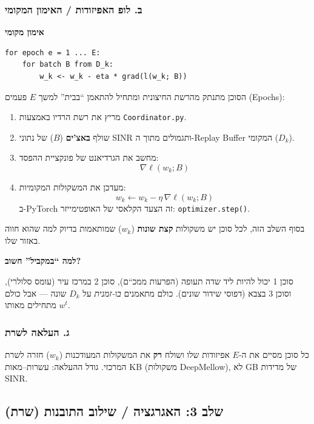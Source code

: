 \documentclass[11pt,a4paper]{article}
\newenvironment{infobox}[2][gray]{%
  \par\smallskip
  \begin{mdframed}[
    linecolor=#1!60!black,
    linewidth=0.7pt,
    backgroundcolor=#1!6,
    roundcorner=3pt,
    innertopmargin=7pt,
    innerbottommargin=7pt,
    innerleftmargin=8pt,
    innerrightmargin=8pt,
    skipabove=6pt,
    skipbelow=6pt
  ]%
  {\color{#1!70!black}\bfseries #2}\par\smallskip
}{%
  \end{mdframed}%
  \par\smallskip
}
\newenvironment{codebox}[1]{\begin{infobox}[gray]{#1}\begin{english}\setLTR}{\end{english}\end{infobox}}
\newcommand{\loss}{\ell}
\begin{document}
\subsubsection{ב. לופ האפיזודות / האימון המקומי}

\begin{codebox}{אימון מקומי}
\begin{lstlisting}[language={}]
for epoch e = 1 ... E:
    for batch B from D_k:
        w_k <- w_k - eta * grad(l(w_k; B))
\end{lstlisting}
\end{codebox}

הסוכן מתנתק מהרשת החיצונית ומתחיל להתאמן ``בבית'' למשך $E$ פעמים (Epochs):

\begin{enumerate}[label=\alph*.]
  \item מריץ את רשת הרדיו באמצעות \texttt{Coordinator.py}.
  \item שולף \textbf{באצ'ים} ($B$) של נתוני SINR ותגמולים מתוך ה-Replay Buffer המקומי ($D_k$).
  \item מחשב את הגרדיאנט של פונקציית ההפסד:
    \[
      \nabla \loss(w_k; B)
    \]
  \item מעדכן את המשקולות המקומיות:
    \[
      w_k \leftarrow w_k - \eta \, \nabla \loss(w_k; B)
    \]
    ב-PyTorch זה הצעד הקלאסי של האופטימייזר: \texttt{optimizer.step()}.
\end{enumerate}

בסוף השלב הזה, לכל סוכן יש משקולות \textbf{קצת שונות} ($w_k$) שמותאמות בדיוק למה שהוא חווה באזור שלו.

\begin{infobox}[orange]{למה ``במקביל'' חשוב?}
סוכן 1 יכול להיות ליד שדה תעופה (הפרעות ממכ``ם), סוכן 2 במרכז עיר (עומס סלולרי), וסוכן 3 בצבא (דפוסי שידור שונים).
כולם מתאמנים \emph{בו-זמנית} על $D_k$ שונה --- אבל כולם מתחילים מאותו $w^t$.
\end{infobox}

\subsubsection{ג. העלאה לשרת}

כל סוכן מסיים את ה-$E$ אפיזודות שלו ושולח \textbf{רק} את המשקולות המעודכנות ($w_k$) חזרה לשרת המרכזי.
גודל ההעלאה: עשרות--מאות KB (משקולות DeepMellow), לא GB של מדידות SINR.

\subsection{שלב 3: האגרגציה / שילוב התובנות (שרת)}
\label{subsec:step3-aggregation}
\end{document}
